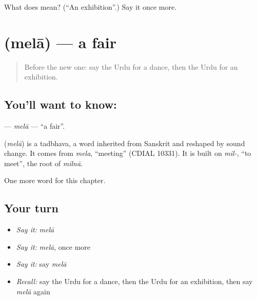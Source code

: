 \begin{tcolorbox}[breakable,colback=teal!4,colframe=teal!35!black,title={Before you move on}]
What does  mean? (\textquotedblleft{}An exhibition\textquotedblright{}.) Say it once more.
\end{tcolorbox}
\section[\texorpdfstring{\ur{میلہ} (melā)}{میلہ (melā)}]{ (melā) — a fair}

\label{lesson:UR-C169-mela}



\begin{quote}
Before the new one: say the Urdu for a dance, then the Urdu for an exhibition.
\end{quote}

\subsection*{You'll want to know: }
\textbf{} — \emph{melā} — \textquotedblleft{}a fair\textquotedblright{}.

\begin{cousinweb}
\textbf{} (\emph{melā}) is a tadbhava, a word inherited from Sanskrit and reshaped by sound change. It comes from \emph{mela}, \textquotedblleft{}meeting\textquotedblright{} (CDIAL 10331). It is built on \emph{mil-}, \textquotedblleft{}to meet\textquotedblright{}, the root of \emph{milnā}.
\end{cousinweb}

\begin{grammarlens}[title={What you've built}]
One more word for this chapter.
\end{grammarlens}

\subsection*{Your turn}
\begin{itemize}
\raggedright
  \item \emph{Say it:} \emph{melā}
  \item \emph{Say it:} \emph{melā}, once more
  \item \emph{Say it:} say \emph{melā}
  \item \emph{Recall:} say the Urdu for a dance, then the Urdu for an exhibition, then say \emph{melā} again
\end{itemize}


